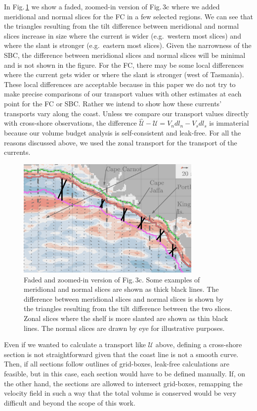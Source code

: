 \documentclass[preprint,3p,review,12pt]{elsarticle}
\begin{document}
In Fig.\,\ref{screenshot} we show a faded, zoomed-in version of Fig.\,3c where we added meridional and normal slices for the FC in a few selected regions. We can see that the triangles resulting from the tilt difference between meridional and normal slices increase in size where the current is wider (e.g.~western most slices) and where the slant is stronger (e.g.~eastern most slices). Given the narrowness of the SBC, the difference between meridional slices and normal slices will be minimal and is not shown in the figure. For the FC, there may be some local differences where the current gets wider or where the slant is stronger (west of Tasmania). These local differences are acceptable because in this paper we do not try to make precise comparisons of our transport values with other estimates at each point for the FC or SBC. Rather we intend to show how these currents' transports vary along the coast. Unless we compare our transport values directly with cross-shore observations, the difference $\mathcal{\hat{U}} - \mathcal{U} = V_{n}dl_{n} - V_{s}dl_{s}$ is immaterial because our volume budget analysis is self-consistent and leak-free. For all the reasons discussed above, we used the zonal transport for the transport of the currents.
%
\begin{figure}[tbhp]
\centering
    \includegraphics[width=0.8\textwidth, keepaspectratio]{screenshot_copy.png}
    \caption{\label{screenshot}%
    Faded and zoomed-in version of Fig.\,3c. Some examples of meridional and normal slices are shown as thick black lines. The difference between meridional slices and normal slices is shown by the triangles resulting from the tilt difference between the two slices. Zonal slices where the shelf is more slanted are shown as thin black lines. The normal slices are drawn by eye for illustrative purposes.}
\end{figure}

Even if we wanted to calculate a transport like $\mathcal{U}$ above, defining a cross-shore section is not straightforward given that the coast line is not a smooth curve. Then, if all sections follow outlines of grid-boxes, leak-free calculations are feasible, but in this case, each section would have to be defined manually. If, on the other hand, the sections are allowed to intersect grid-boxes, remapping the velocity field in such a way that the total volume is conserved would be very difficult and beyond the scope of this work. 

\clearpage


\end{document}
